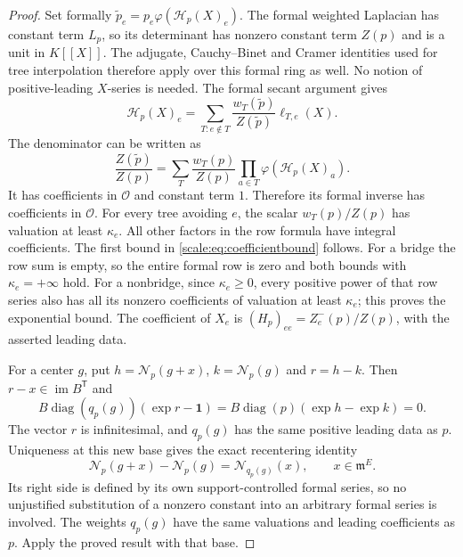 \documentclass[11pt,a4paper]{article}
\numberwithin{equation}{section}
\theoremstyle{definition}
\newcommand{\OO}{\mathcal O}
\newcommand{\mm}{\mathfrak m}
\newcommand{\NN}{\mathcal N}
\newcommand{\im}{\operatorname{im}}
\newcommand{\diag}{\operatorname{diag}}
\newcommand{\ph}{\varphi}
\begin{document}
\begin{proof}
Set formally $\widetilde p_e=p_e\ph(\mathcal H_p(X)_e)$.
The formal weighted Laplacian has constant term $L_p$, so its determinant
has nonzero constant term $Z(p)$ and is a unit in $K[[X]]$.
The adjugate, Cauchy--Binet and Cramer identities used for tree interpolation
therefore apply over this formal ring as well. No notion of positive-leading
$X$-series is needed. The formal secant argument gives
\[
 \mathcal H_p(X)_e=
 \sum_{T:e\notin T}
     \frac{w_T(\widetilde p)}{Z(\widetilde p)}\ell_{T,e}(X).
\]
The denominator can be written as
\[
 \frac{Z(\widetilde p)}{Z(p)}
 =\sum_T\frac{w_T(p)}{Z(p)}
          \prod_{a\in T}\ph(\mathcal H_p(X)_a).
\]
It has coefficients in $\OO$ and constant term $1$. Therefore its
formal inverse has coefficients in $\OO$. For every tree avoiding
$e$, the scalar $w_T(p)/Z(p)$ has valuation at least $\kappa_e$.
All other factors in the row formula have integral coefficients.
The first bound in \eqref{scale:eq:coefficientbound} follows. For a
bridge the row sum is empty, so the entire formal row is zero and both
bounds with $\kappa_e=+\infty$ hold. For a nonbridge,
since $\kappa_e\geq0$, every positive power of that row series also
has all its nonzero coefficients of valuation at least $\kappa_e$;
this proves the exponential bound. The coefficient of $X_e$ is
$(H_p)_{ee}=Z_e^-(p)/Z(p)$, with the asserted leading data.

For a center $g$, put $h=\NN_p(g+x)$, $k=\NN_p(g)$ and $r=h-k$.
Then $r-x\in\im B^{\mathsf T}$ and
\[
 B\diag(q_p(g))(\exp r-\mathbf1)
   =B\diag(p)(\exp h-\exp k)=0.
\]
The vector $r$ is infinitesimal, and $q_p(g)$ has the same positive leading
data as $p$. Uniqueness at this new base gives the exact recentering identity
\begin{equation}\label{scale:eq:recenter}
 \NN_p(g+x)-\NN_p(g)=\NN_{q_p(g)}(x),\qquad x\in\mm^E.
\end{equation}
Its right side is defined by its own support-controlled formal
series, so no unjustified substitution of a nonzero constant into
an arbitrary formal series is involved. The weights $q_p(g)$ have
the same valuations and leading coefficients as $p$. Apply the
proved result with that base.
\end{proof}
\end{document}
